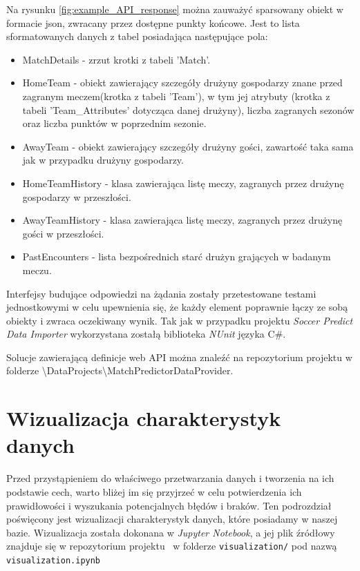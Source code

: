     Na rysunku \ref{fig:example_API_response} można zauważyć sparsowany obiekt w formacie json, zwracany przez dostępne punkty końcowe. Jest to lista sformatowanych danych z tabel posiadająca następujące pola:
    \begin{itemize}
        \item MatchDetails - zrzut krotki z tabeli 'Match'.

        \item HomeTeam - obiekt zawierający szczegóły drużyny gospodarzy znane przed zagranym meczem(krotka z tabeli 'Team'), w tym jej atrybuty (krotka z tabeli 'Team\_Attributes' dotycząca danej drużyny), liczba zagranych sezonów oraz liczba punktów w poprzednim sezonie.
        \item AwayTeam - obiekt zawierający szczegóły drużyny gości, zawartość taka sama jak w przypadku drużyny gospodarzy.
        \item HomeTeamHistory - klasa zawierająca listę meczy, zagranych przez drużynę gospodarzy w przeszłości.
        \item AwayTeamHistory - klasa zawierająca listę meczy, zagranych przez drużynę gości w przeszłości.
        \item PastEncounters - lista bezpośrednich starć drużyn grających w badanym meczu.
    \end{itemize}
    
    Interfejsy budujące odpowiedzi na żądania zostały przetestowane testami jednostkowymi w celu upewnienia się, że każdy element poprawnie łączy ze sobą obiekty i zwraca oczekiwany wynik. Tak jak w przypadku projektu \textit{Soccer Predict Data Importer} wykorzystana zostałą biblioteka \textit{NUnit} języka C\#.
    
    Solucje zawierającą definicje web API można znaleźć na repozytorium projektu \cite{repo} w folderze \textbackslash DataProjects\textbackslash MatchPredictorDataProvider.
    
    \section{Wizualizacja charakterystyk danych}
    \noindent Przed przystąpieniem do właściwego przetwarzania danych i tworzenia na ich podstawie cech, warto bliżej im się przyjrzeć w celu potwierdzenia ich prawidłowości i wyszukania potencjalnych błędów i braków. Ten podrozdział poświęcony jest wizualizacji charakterystyk danych, które posiadamy w naszej bazie. Wizualizacja została dokonana w \emph{Jupyter Notebook}, a jej plik źródłowy znajduje się w repozytorium projektu~\cite{repo} w folderze \texttt{visualization/} pod nazwą \texttt{visualization.ipynb}
    
